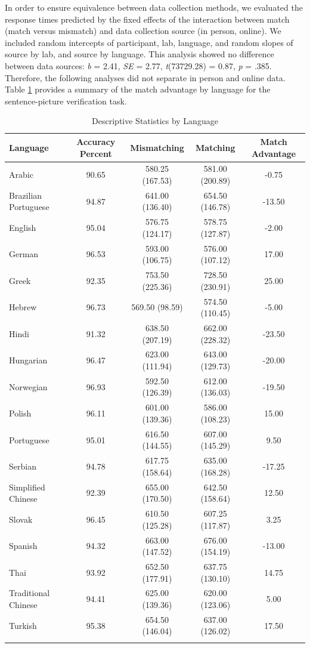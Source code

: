 \documentclass[
  man,floatsintext]{apa7}
\begin{document}
In order to ensure equivalence between data collection methods, we evaluated the response times predicted by the fixed effects of the interaction between match (match versus mismatch) and data collection source (in person, online). We included random intercepts of participant, lab, language, and random slopes of source by lab, and source by language. This analysis showed no difference between data sources: \emph{b} = 2.41, \emph{SE} = 2.77, \emph{t}(73729.28) = 0.87, \emph{p} = .385. Therefore, the following analyses did not separate in person and online data. Table \ref{tab:summary-languages} provides a summary of the match advantage by language for the sentence-picture verification task.

\begin{table}[tbp]

\begin{center}
\begin{threeparttable}

\caption{\label{tab:summary-languages}Descriptive Statistics by Language}

\begin{tabular}{lcccc}
\toprule
Language & Accuracy Percent & Mismatching & Matching & Match Advantage\\
\midrule
Arabic & 90.65 & 580.25 (167.53) & 581.00 (200.89) & -0.75\\
Brazilian Portuguese & 94.87 & 641.00 (136.40) & 654.50 (146.78) & -13.50\\
English & 95.04 & 576.75 (124.17) & 578.75 (127.87) & -2.00\\
German & 96.53 & 593.00 (106.75) & 576.00 (107.12) & 17.00\\
Greek & 92.35 & 753.50 (225.36) & 728.50 (230.91) & 25.00\\
Hebrew & 96.73 & 569.50 (98.59) & 574.50 (110.45) & -5.00\\
Hindi & 91.32 & 638.50 (207.19) & 662.00 (228.32) & -23.50\\
Hungarian & 96.47 & 623.00 (111.94) & 643.00 (129.73) & -20.00\\
Norwegian & 96.93 & 592.50 (126.39) & 612.00 (136.03) & -19.50\\
Polish & 96.11 & 601.00 (139.36) & 586.00 (108.23) & 15.00\\
Portuguese & 95.01 & 616.50 (144.55) & 607.00 (145.29) & 9.50\\
Serbian & 94.78 & 617.75 (158.64) & 635.00 (168.28) & -17.25\\
Simplified Chinese & 92.39 & 655.00 (170.50) & 642.50 (158.64) & 12.50\\
Slovak & 96.45 & 610.50 (125.28) & 607.25 (117.87) & 3.25\\
Spanish & 94.32 & 663.00 (147.52) & 676.00 (154.19) & -13.00\\
Thai & 93.92 & 652.50 (177.91) & 637.75 (130.10) & 14.75\\
Traditional Chinese & 94.41 & 625.00 (139.36) & 620.00 (123.06) & 5.00\\
Turkish & 95.38 & 654.50 (146.04) & 637.00 (126.02) & 17.50\\
\bottomrule
\addlinespace
\end{tabular}


\end{threeparttable}
\end{center}
\end{table}
\end{document}
